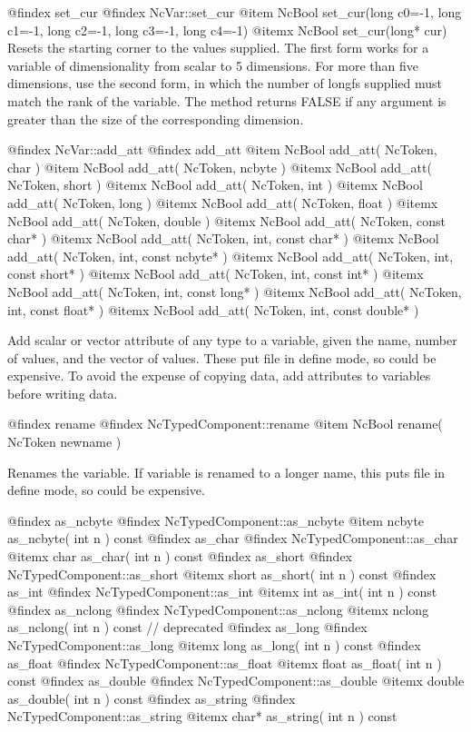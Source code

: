 @findex set_cur
@findex NcVar::set_cur
@item NcBool set_cur(long c0=-1, long c1=-1, long c2=-1, long c3=-1, long c4=-1)
@itemx NcBool set_cur(long* cur)
Resets the starting corner to the values supplied.  The first form works
for a variable of dimensionality from scalar to 5 dimensions.  For more
than five dimensions, use the second form, in which the number of longfs
supplied must match the rank of the variable.  The method returns FALSE if
any argument is greater than the size of the corresponding dimension.

@findex NcVar::add_att
@findex add_att
@item  NcBool add_att( NcToken, char )
@item  NcBool add_att( NcToken, ncbyte )
@itemx NcBool add_att( NcToken, short )
@itemx NcBool add_att( NcToken, int )
@itemx NcBool add_att( NcToken, long )
@itemx NcBool add_att( NcToken, float )
@itemx NcBool add_att( NcToken, double )
@itemx NcBool add_att( NcToken, const char* )
@itemx NcBool add_att( NcToken, int, const char* )
@itemx NcBool add_att( NcToken, int, const ncbyte* )
@itemx NcBool add_att( NcToken, int, const short* )
@itemx NcBool add_att( NcToken, int, const int* )
@itemx NcBool add_att( NcToken, int, const long* )
@itemx NcBool add_att( NcToken, int, const float* )
@itemx NcBool add_att( NcToken, int, const double* )

Add scalar or vector attribute of any type to a variable, given the
name, number of values, and the vector of values.  These put file in
define mode, so could be expensive.  To avoid the expense of copying
data, add attributes to variables before writing data.

@findex rename
@findex NcTypedComponent::rename
@item NcBool rename( NcToken newname )

Renames the variable.  If variable is renamed to a longer name, this
puts file in define mode, so could be expensive.

@findex as_ncbyte
@findex NcTypedComponent::as_ncbyte
@item ncbyte as_ncbyte( int n ) const
@findex as_char
@findex NcTypedComponent::as_char
@itemx char as_char( int n ) const
@findex as_short
@findex NcTypedComponent::as_short
@itemx short as_short( int n ) const
@findex as_int
@findex NcTypedComponent::as_int
@itemx int as_int( int n ) const
@findex as_nclong
@findex NcTypedComponent::as_nclong
@itemx nclong as_nclong( int n ) const // deprecated
@findex as_long
@findex NcTypedComponent::as_long
@itemx long as_long( int n ) const
@findex as_float
@findex NcTypedComponent::as_float
@itemx float as_float( int n ) const
@findex as_double
@findex NcTypedComponent::as_double
@itemx double as_double( int n ) const
@findex as_string
@findex NcTypedComponent::as_string
@itemx char* as_string( int n ) const

